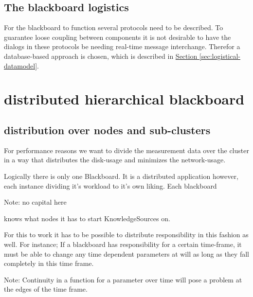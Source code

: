 \documentclass[]{lofar}
\begin{document}
    \subsection{The blackboard logistics}
    \label{subsec:blackboard-logistics}\hypertarget{subsec:blackboard-logistics}{}%

      For the blackboard to function several protocols need to be
      described. To guarantee loose coupling between components it is
      not desirable to have the dialogs in these protocols be needing
      real-time message interchange. Therefor a database-based
      approach is chosen, which is described in
      \hyperlink{sec:logistical-datamodel}{Section
      \ref{sec:logistical-datamodel}}.

  \section{distributed hierarchical blackboard}
  \label{sec:distributed-hierarchical-blackboard}\hypertarget{sec:distributed-hierarchical-blackboard}{}%

    \subsection{distribution over nodes and sub-clusters}
    \label{subsec:distribution}\hypertarget{subsec:distribution}{}%

      For performance reasons we want to divide the measurement data
      over the cluster in a way that distributes the disk-usage and
      minimizes the network-usage.

      Logically there is only one Blackboard. It is a distributed
      application however, each instance dividing it's workload to
      it's own liking. Each blackboard
      \begin{em}\large{Note: }
        no capital here
      \end{em}
      knows what nodes it has to start KnowledgeSources on.

      For this to work it has to be possible to distribute
      responsibility in this fashion as well. For instance; If a
      blackboard has responsibility for a certain time-frame, it must
      be able to change any time dependent parameters at will as long
      as they fall completely in this time frame.
      \begin{em}\large{Note: }Continuity in a function for a parameter over time will pose a problem at the edges of the time frame.\end{em}
\end{document}
